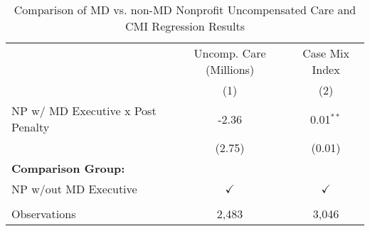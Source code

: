 \begin{table}[htbp]
   \caption{\label{tab:MD_noMD_uncomp_CMI_fullsample} Comparison of MD vs. non-MD Nonprofit Uncompensated Care and CMI Regression Results}
   \bigskip
   \centering
   \begin{tabular}{lcc}
      \toprule
                                        & Uncomp. Care (Millions) & Case Mix Index\\  
                                        & (1)                     & (2)\\  
      \midrule 
      NP w/ MD Executive x Post Penalty & -2.36                   & 0.01$^{**}$\\   
                                        & (2.75)                  & (0.01)\\   
      \textbf{Comparison Group:}        &                         & \\  
      NP w/out MD Executive             & $\checkmark$            & $\checkmark$\\   
       \\
      Observations                      & 2,483                   & 3,046\\  
      \bottomrule
   \end{tabular}
\end{table}
